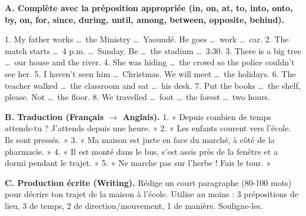 \documentclass[11pt]{article}
\begin{document}
\begin{exercice}
\textbf{A. Complète avec la préposition appropriée (in, on, at, to, into, onto, by, on, for, since, during, until, among, between, opposite, behind).}

1. My father works \dots\ the Ministry \dots\ Yaoundé. He goes \dots\ work \dots\ car.
2. The match starts \dots\ 4 p.m. \dots\ Sunday. Be \dots\ the stadium \dots\ 3:30.
3. There is a big tree \dots\ our house and the river.
4. She was hiding \dots\ the crowd so the police couldn't see her.
5. I haven't seen him \dots\ Christmas. We will meet \dots\ the holidays.
6. The teacher walked \dots\ the classroom and sat \dots\ his desk.
7. Put the books \dots\ the shelf, please. Not \dots\ the floor.
8. We travelled \dots\ foot \dots\ the forest \dots\ two hours.

\textbf{B. Traduction (Français $\rightarrow$ Anglais).}
1. « Depuis combien de temps attends-tu ? J'attends depuis une heure. »
2. « Les enfants courent vers l'école. Ils sont pressés. »
3. « Ma maison est juste en face du marché, à côté de la pharmacie. »
4. « Il est monté dans le bus, s'est assis près de la fenêtre et a dormi pendant le trajet. »
5. « Ne marche pas sur l'herbe ! Fais le tour. »

\textbf{C. Production écrite (Writing).}
Rédige un court paragraphe (80-100 mots) pour décrire ton trajet de la maison à l'école. Utilise au moins : 3 prépositions de lieu, 3 de temps, 2 de direction/mouvement, 1 de manière. Souligne-les.
\end{exercice}
\end{document}
